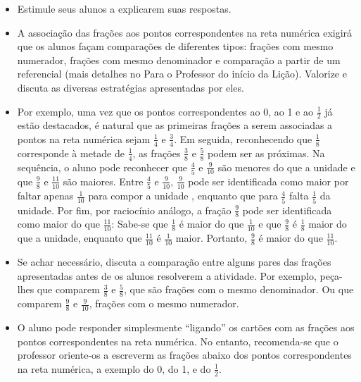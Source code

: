 \begin{orientacoes}{}{}
\begin{itemize}
    \item       Estimule seus alunos a explicarem suas respostas.
    \item       A associação das frações aos pontos correspondentes na reta numérica exigirá que os alunos façam comparações de diferentes tipos: frações com mesmo numerador, frações com mesmo denominador e comparação a partir de um referencial (mais detalhes no Para o Professor do início da Lição). Valorize e discuta as diversas estratégias apresentadas por eles.
    \item       Por exemplo, uma vez que os pontos correspondentes ao 0, ao 1 e ao $\frac{1}{2}$ já estão destacados, é natural que as primeiras frações a serem associadas a pontos na reta numérica sejam       $\frac{1}{4}$       e       $\frac{3}{4}$. Em seguida, reconhecendo que       $\frac{1}{8}$       corresponde à metade de       $\frac{1}{4}$,  as frações       $\frac{3}{8}$       e       $\frac{5}{8}$       podem ser as próximas.  Na sequência, o aluno pode reconhecer que       $\frac{4}{5}$       e       $\frac{9}{10}$       são menores do que a unidade e que       $\frac{9}{8}$       e       $\frac{11}{10}$       são maiores.  Entre       $\frac{4}{5}$       e       $\frac{9}{10}$,       $\frac{9}{10}$       pode ser identificada como maior por faltar  apenas       $\frac{1}{10}$       para compor a unidade , enquanto que para       $\frac{4}{5}$       falta       $\frac{1}{5}$       da unidade. Por fim, por raciocínio análogo, a fração       $\frac{9}{8}$       pode ser identificada como maior do que       $\frac{11}{10}$: Sabe-se que $\frac{1}{8}$ é maior do que $\frac{1}{10}$ e que $\frac{9}{8}$  é  $\frac{1}{8}$       maior do que a unidade, enquanto que       $\frac{11}{10}$       é        $\frac{1}{10}$       maior. Portanto, $\frac{9}{8}$    é maior do que       $\frac{11}{10}$.
    \item       Se achar necessário, discuta a comparação entre alguns pares das frações apresentadas antes de os alunos resolverem a atividade. Por exemplo, peça-lhes que comparem       $\frac{3}{8}$        e       $\frac{5}{8}$, que são frações com o mesmo denominador. Ou que comparem       $\frac{9}{8}$       e       $\frac{9}{10}$, frações com o mesmo numerador.
    \item       O aluno pode responder simplesmente       ``ligando''       os cartões com as frações aos pontos correspondentes na reta numérica. No entanto, recomenda-se que o professor oriente-os a escreverm as frações abaixo dos pontos correspondentes na reta numérica, a exemplo do 0, do 1, e do       $\frac{1}{2}$.
\end{itemize} %
\end{orientacoes}

